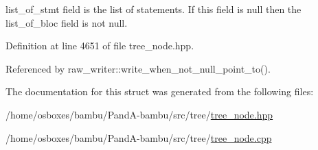 list\+\_\+of\+\_\+stmt field is the list of statements. If this field is null then the list\+\_\+of\+\_\+bloc field is not null. 



Definition at line 4651 of file tree\+\_\+node.\+hpp.



Referenced by raw\+\_\+writer\+::write\+\_\+when\+\_\+not\+\_\+null\+\_\+point\+\_\+to().



The documentation for this struct was generated from the following files\+:\begin{DoxyCompactItemize}
\item 
/home/osboxes/bambu/\+Pand\+A-\/bambu/src/tree/\hyperlink{tree__node_8hpp}{tree\+\_\+node.\+hpp}\item 
/home/osboxes/bambu/\+Pand\+A-\/bambu/src/tree/\hyperlink{tree__node_8cpp}{tree\+\_\+node.\+cpp}\end{DoxyCompactItemize}
